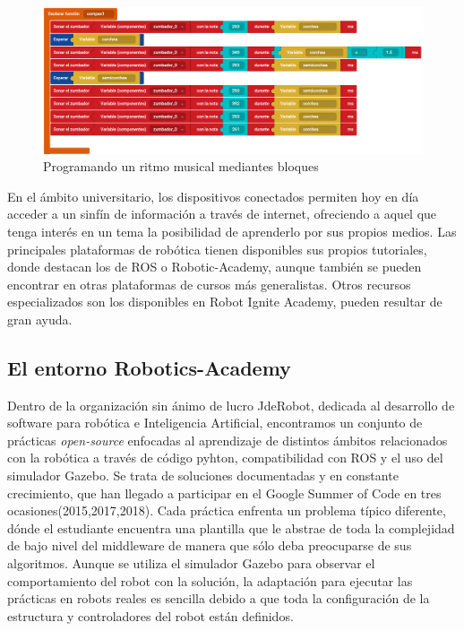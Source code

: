 \documentclass[12pt,spanish,chapterprefix, numbers=noenddot]{book}
\numberwithin{equation}{section}
\numberwithin{figure}{section}
\begin{document}
    \begin{figure}[h!]
    \centering
    \includegraphics[width=12cm]{Figs/compas_bitbloq.png}
    \par
    \caption{\label{fig:bitbloq}Programando un ritmo musical mediantes bloques}
    \end{figure}

En el ámbito universitario, los dispositivos conectados permiten hoy en día acceder a un sinfín de información a través de internet, ofreciendo a aquel que tenga interés en un tema la posibilidad de aprenderlo por sus propios medios. 
Las principales plataformas de robótica tienen disponibles sus propios tutoriales, donde destacan los de ROS o Robotic-Academy, aunque también se pueden encontrar en otras plataformas de cursos más generalistas. Otros recursos especializados son los disponibles en Robot Ignite Academy, pueden resultar de gran ayuda. 

\subsection{El entorno Robotics-Academy}
Dentro de la organización sin ánimo de lucro JdeRobot\cite{jderobot}, dedicada al desarrollo de software para robótica e Inteligencia Artificial, encontramos un conjunto de prácticas \textit{open-source} enfocadas al aprendizaje de distintos ámbitos relacionados con la robótica a través de código pyhton, compatibilidad con ROS y el uso del simulador Gazebo. Se trata de soluciones documentadas y en constante crecimiento, que han llegado a participar en el Google Summer of Code en tres ocasiones(2015,2017,2018).
Cada práctica enfrenta un problema típico diferente, dónde el estudiante encuentra una plantilla que le abstrae de toda la complejidad de bajo nivel del middleware de manera que sólo deba preocuparse de sus algoritmos. 
Aunque se utiliza el simulador Gazebo para observar el comportamiento del robot con la solución, la adaptación para ejecutar las prácticas en robots reales es sencilla debido a que toda la configuración de la estructura y controladores del robot están definidos.
\end{document}
